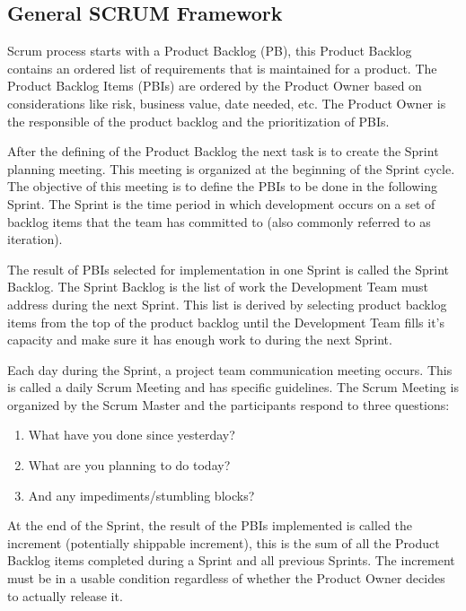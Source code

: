 \subsection{General SCRUM Framework}

Scrum process starts with a Product Backlog (PB), this Product Backlog contains an ordered list of requirements that is maintained for a product. The Product Backlog Items (PBIs) are ordered by the Product Owner based on considerations like risk, business value, date needed, etc. The Product Owner is the responsible of the product backlog and the prioritization of PBIs.

After the defining of the Product Backlog the next task is to create the Sprint planning meeting. This meeting is organized at the beginning of the Sprint cycle. The objective of this meeting is to define the PBIs to be done in the following Sprint. The Sprint is the time period in which development occurs on a set of backlog items that the team has committed to (also commonly referred to as iteration). 

The result of PBIs selected for implementation in one Sprint is called the Sprint Backlog. The Sprint Backlog is the list of work the Development Team must address during the next Sprint. This list is derived by selecting product backlog items from the top of the product backlog until the Development Team fills it's capacity and make sure it has enough work to during the next Sprint.

Each day during the Sprint, a project team communication meeting occurs. This is called a daily Scrum Meeting and has specific guidelines. The Scrum Meeting is organized by the Scrum Master and the participants respond to three questions:
\begin{enumerate}
\item  What have you done since yesterday?
\item What are you planning to do today? 
\item And any impediments/stumbling blocks?
\end{enumerate}
At the end of the Sprint, the result of the PBIs implemented is called the increment (potentially shippable increment), this is the sum of all the Product Backlog items completed during a Sprint and all previous Sprints. The increment must be in a usable condition regardless of whether the Product Owner decides to actually release it.

